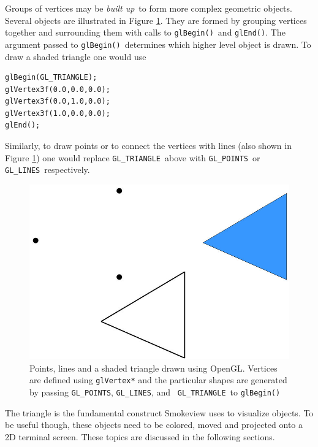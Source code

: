 \documentclass[11pt,twoside]{book}
\begin{document}
Groups of vertices may be {\em built up}\ to form more complex geometric objects. Several objects are illustrated in Figure \ref{figshapes}.  They are formed by grouping vertices together and surrounding them with calls to {\tt glBegin()}\ and {\tt glEnd()}. The argument passed to {\tt glBegin()}\ determines which higher level object is drawn. To draw a shaded triangle one would use
\begin{lstlisting}
glBegin(GL_TRIANGLE);
glVertex3f(0.0,0.0,0.0);
glVertex3f(0.0,1.0,0.0);
glVertex3f(1.0,0.0,0.0);
glEnd();
\end{lstlisting}
Similarly, to draw points or to connect the vertices with lines (also shown in Figure \ref{figshapes}) one would replace {\tt GL\_TRIANGLE}\ above with {\tt GL\_POINTS}\ or {\tt GL\_LINES}\ respectively.
\begin{figure}[\figoptions]
\begin{center}
\includegraphics[width=6.0in]{FIGURES/shapes}
\end{center}
\caption[Points, lines and a shaded triangle drawn using OpenGL.]
{Points, lines and a shaded triangle drawn using OpenGL. Vertices
are defined using {\tt glVertex*} and the particular shapes are
generated by passing {\tt GL\_POINTS}, {\tt GL\_LINES}, and {\tt
GL\_TRIANGLE}\ to {\tt glBegin()} } \label{figshapes}
\end{figure}

The triangle is the fundamental construct Smokeview uses to visualize objects.  To be useful though, these objects need to be colored, moved and projected onto a 2D terminal screen. These topics are discussed in the following sections.

%
%
\end{document}
